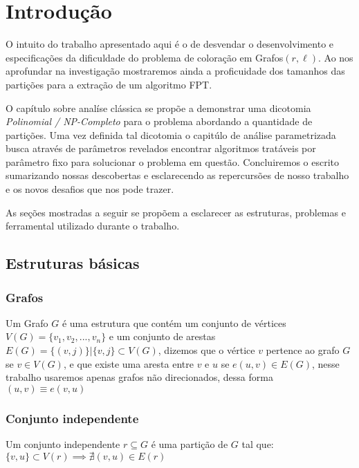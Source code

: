 \chapter{Introdução} \label{cap:intro}

O intuito do trabalho apresentado aqui é o de desvendar o desenvolvimento e especificações da dificuldade do problema de coloração em Grafos$(r,\ell)$. Ao nos aprofundar na investigação mostraremos ainda a proficuidade dos tamanhos das partições para a extração de um algoritmo FPT. 

O capítulo sobre analíse clássica se propõe a demonstrar uma dicotomia \emph{Polinomial / NP-Completo} para o problema abordando a quantidade de partições. Uma vez definida tal dicotomia o capitúlo de análise parametrizada busca através de parâmetros revelados encontrar algoritmos tratáveis por parâmetro fixo para solucionar o problema em questão. Concluiremos o escrito sumarizando nossas descobertas e esclarecendo as repercursões de nosso trabalho e os novos desafios que nos pode trazer.

As seções mostradas a seguir se propõem a esclarecer as estruturas, problemas e ferramental utilizado durante o trabalho.

\section{Estruturas básicas}

\subsection{Grafos}
\begin{definition}
 Um Grafo $G$ é uma estrutura que contém um conjunto de vértices $V(G) = \{v_1,v_2,...,v_n\}$ e um conjunto de arestas $E(G)=\{(v,j)\} | \{v,j\} \subset V(G)$, dizemos que o vértice $v$ pertence ao grafo $G$ se $v \in V(G)$, e que existe uma aresta entre $v$ e $u$ se $e(u,v) \in E(G)$, nesse trabalho usaremos apenas grafos não direcionados, dessa forma $(u,v) \equiv e(v,u)$
\end{definition}

\subsection{Conjunto independente}
\begin{definition}
Um conjunto independente $r \subseteq G$ é uma partição de $G$ tal que: $ \{v,u\} \subset V(r) \implies \nexists (v,u) \in E(r)$
\end{definition}

